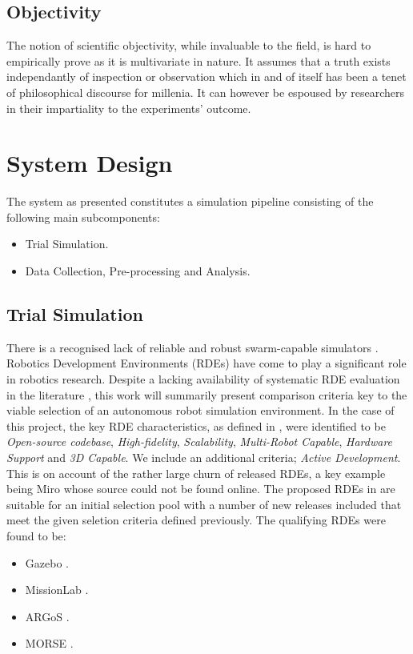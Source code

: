 \documentclass{report}
\begin{document}
\subsection{Objectivity}

The notion of scientific objectivity, while invaluable to the field, is hard to empirically prove as it is multivariate in nature. It assumes that a truth exists independantly of inspection or observation which in and of itself has been a tenet of philosophical discourse for millenia. It can however be espoused by researchers in their impartiality to the experiments' outcome.

\newpage

\section{System Design} \label{system_design}
The system as presented constitutes a simulation pipeline consisting of the following main subcomponents:
\begin{itemize}
	\item Trial Simulation.
	\item Data Collection, Pre-processing and Analysis.
\end{itemize}

\subsection{Trial Simulation}
There is a recognised lack of reliable and robust swarm-capable simulators \cite{Noronha2016}. Robotics Development Environments (RDEs) have come to play a significant role in robotics research. Despite a lacking availability of systematic RDE evaluation in the literature \cite{Kramer2007}, this work will summarily present comparison criteria key to the viable selection of an autonomous robot simulation environment. In the case of this project, the key RDE characteristics, as defined in \cite{Kramer2007}, were identified to be \textit{Open-source codebase}, \textit{High-fidelity}, \textit{Scalability}, \textit{Multi-Robot Capable}, \textit{Hardware Support} and \textit{3D Capable}. We include an additional criteria; \textit{Active Development}. This is on account of the rather large churn of released RDEs, a key example being Miro \cite{Enderle2001} whose source could not be found online. The proposed RDEs in \cite{Kramer2007} are suitable for an initial selection pool with a number of new releases included that meet the given seletion criteria defined previously. The qualifying RDEs were found to be:
\begin{itemize}
	\item Gazebo \cite{Koenig2004}.
	\item MissionLab \cite{MISSIONLAB}.
	\item ARGoS \cite{Pinciroli2011}.
	\item MORSE \cite{Morse2011}.
\end{itemize}
\end{document}
